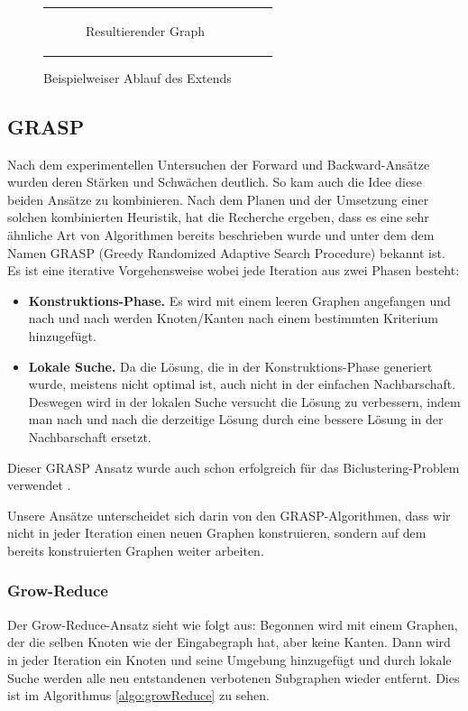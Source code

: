\documentclass[12pt,a4paper,onecolumn,oneside,titlepage]{article}
\begin{document}
\begin{figure}
\begin{tabular}[c]{ccc}
\begin{subfigure}[b]{0.32\textwidth}
      \caption{Resultierender Graph}
      \label{fig:algo:extend:6}
    \end{subfigure}
  \end{tabular}
  \caption{Beispielweiser Ablauf des Extends}\label{fig:algo:extend}
\end{figure}

\subsection{GRASP}
Nach dem experimentellen Untersuchen der Forward und Backward-Ansätze wurden deren Stärken und Schwächen deutlich. So kam auch die Idee diese beiden Ansätze zu kombinieren. Nach dem Planen und der Umsetzung einer solchen kombinierten Heuristik, hat die Recherche ergeben, dass es eine sehr ähnliche Art von Algorithmen bereits beschrieben wurde und unter dem dem Namen GRASP (Greedy Randomized Adaptive Search Procedure) \cite{Feo95} \cite{Bastos2014} bekannt ist. Es ist eine iterative Vorgehensweise wobei jede Iteration aus zwei Phasen besteht: 
\begin{itemize}
\item \textbf{Konstruktions-Phase.} Es wird mit einem leeren Graphen angefangen und nach und nach werden Knoten/Kanten nach einem bestimmten Kriterium hinzugefügt.
\item \textbf{Lokale Suche.} Da die Lösung, die in der Konstruktions-Phase generiert wurde, meistens nicht optimal ist, auch nicht in der einfachen Nachbarschaft. Deswegen wird in der lokalen Suche versucht die Lösung zu verbessern, indem man nach und nach die derzeitige Lösung durch eine bessere Lösung in der Nachbarschaft ersetzt.
\end{itemize}
Dieser GRASP Ansatz wurde auch schon erfolgreich für das Biclustering-Problem verwendet \cite{De12}.

Unsere Ansätze unterscheidet sich darin von den GRASP-Algorithmen, dass wir nicht in jeder Iteration einen neuen Graphen konstruieren, sondern auf dem bereits konstruierten Graphen weiter arbeiten. 

\subsubsection{Grow-Reduce}
Der Grow-Reduce-Ansatz sieht wie folgt aus: Begonnen wird mit einem Graphen, der die selben Knoten wie der Eingabegraph hat, aber keine Kanten. Dann wird in jeder Iteration ein Knoten und seine Umgebung hinzugefügt und durch lokale Suche werden alle neu entstandenen verbotenen Subgraphen wieder entfernt. Dies ist im Algorithmus \ref{algo:growReduce} zu sehen. 
\end{document}
